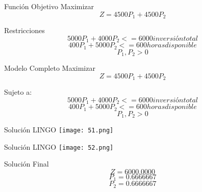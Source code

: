 \documentclass{beamer}
\begin{document}
\begin{frame}[fragile]{Función Objetivo}
Maximizar\\
\[Z = 4500P_{1} + 4500P_{2}\]

\end{frame}

\begin{frame}[fragile]{Restricciones}
\[5000P_{1} + 4000P_{2} <= 6000 inversión total\]
\[400P_{1} + 5000P_{2} <= 600 horas disponible\]
\[P_{1}, P_{2} > 0\]

\end{frame}

\begin{frame}[fragile]{Modelo Completo}
Maximizar\\
\[Z = 4500P_{1} + 4500P_{2}\]

Sujeto a:\\
\[5000P_{1} + 4000P_{2} <= 6000 inversión total\]
\[400P_{1} + 5000P_{2} <= 600 horas disponible\]
\[P_{1}, P_{2} > 0\]

\end{frame}

\begin{frame}[fragile]{Solución LINGO}
    \texttt{[image: 51.png]}
\end{frame}
\begin{frame}[fragile]{Solución LINGO}
    \texttt{[image: 52.png]}
\end{frame}

\begin{frame}[fragile]{Solución Final}
\[Z = 6 000.0000\]
\[P_{1} = 0.6666667\]
\[P_{2} = 0.6666667\]
\end{frame}
\end{document}

